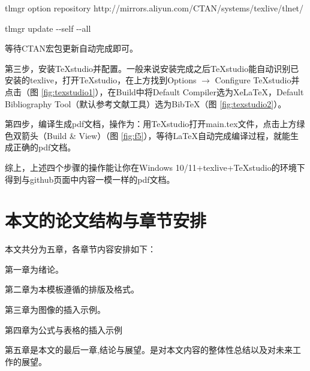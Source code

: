 \noindent tlmgr option repository http://mirrors.aliyun.com/CTAN/systems/texlive/tlnet/

\noindent tlmgr update $ \text{-}\text{-} $self $ \text{-}\text{-} $all

\noindent 等待CTAN宏包更新自动完成即可。


第三步，安装TeXstudio并配置。一般来说安装完成之后TeXstudio能自动识别已安装的texlive，打开TeXstudio，在上方找到Options $\rightarrow$ Configure TeXstudio并点击（图 \ref{fig:texstudio1}），在Build中将Default Compiler选为XeLaTeX，Default Bibliography Tool（默认参考文献工具）选为BibTeX（图 \ref{fig:texstudio2}）。



第四步，编译生成pdf文档，操作为：用TeXstudio打开main.tex文件，点击上方绿色双箭头（Build \& View）（图 \ref{fig:f5}），等待LaTeX自动完成编译过程，就能生成正确的pdf文档。


综上，上述四个步骤的操作能让你在Windows 10/11+texlive+TeXstudio的环境下得到与github页面中内容一模一样的pdf文档。

\section{本文的论文结构与章节安排}
\label{sec:arrangement}
本文共分为五章，各章节内容安排如下：

第一章为绪论。

第二章为本模板遵循的排版及格式。

第三章为图像的插入示例。

第四章为公式与表格的插入示例

第五章是本文的最后一章,结论与展望。是对本文内容的整体性总结以及对未来工作的展望。

